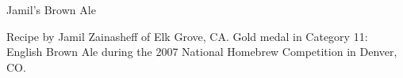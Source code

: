 \begin{recipe}{Jamil's Brown Ale} %

\begin{aboutblock}
Recipe by Jamil Zainasheff of Elk Grove, CA. Gold medal in Category 11: English
Brown Ale during the 2007 National Homebrew Competition in Denver, CO.
\sourceaha
\end{aboutblock}


\begin{methodandtiming}

\begin{mashsteps}
\end{mashsteps}

\end{methodandtiming}

\recipebreak

\begin{ingredientsblock}

\begin{malts}
\end{malts}

\begin{hops}
\end{hops}


\end{ingredientsblock}

\end{recipe}

